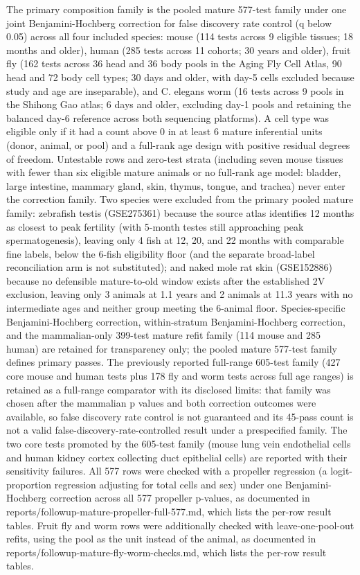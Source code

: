 \documentclass[11pt]{article}
\begin{document}
The primary composition family is the pooled mature 577-test family under one joint Benjamini-Hochberg correction for false discovery rate control (q below 0.05) across all four included species: mouse (114 tests across 9 eligible tissues; 18 months and older), human (285 tests across 11 cohorts; 30 years and older), fruit fly (162 tests across 36 head and 36 body pools in the Aging Fly Cell Atlas, 90 head and 72 body cell types; 30 days and older, with day-5 cells excluded because study and age are inseparable), and C. elegans worm (16 tests across 9 pools in the Shihong Gao atlas; 6 days and older, excluding day-1 pools and retaining the balanced day-6 reference across both sequencing platforms). A cell type was eligible only if it had a count above 0 in at least 6 mature inferential units (donor, animal, or pool) and a full-rank age design with positive residual degrees of freedom. Untestable rows and zero-test strata (including seven mouse tissues with fewer than six eligible mature animals or no full-rank age model: bladder, large intestine, mammary gland, skin, thymus, tongue, and trachea) never enter the correction family. Two species were excluded from the primary pooled mature family: zebrafish testis (GSE275361) because the source atlas identifies 12 months as closest to peak fertility (with 5-month testes still approaching peak spermatogenesis), leaving only 4 fish at 12, 20, and 22 months with comparable fine labels, below the 6-fish eligibility floor (and the separate broad-label reconciliation arm is not substituted); and naked mole rat skin (GSE152886) because no defensible mature-to-old window exists after the established 2V exclusion, leaving only 3 animals at 1.1 years and 2 animals at 11.3 years with no intermediate ages and neither group meeting the 6-animal floor. Species-specific Benjamini-Hochberg correction, within-stratum Benjamini-Hochberg correction, and the mammalian-only 399-test mature refit family (114 mouse and 285 human) are retained for transparency only; the pooled mature 577-test family defines primary passes. The previously reported full-range 605-test family (427 core mouse and human tests plus 178 fly and worm tests across full age ranges) is retained as a full-range comparator with its disclosed limits: that family was chosen after the mammalian p values and both correction outcomes were available, so false discovery rate control is not guaranteed and its 45-pass count is not a valid false-discovery-rate-controlled result under a prespecified family. The two core tests promoted by the 605-test family (mouse lung vein endothelial cells and human kidney cortex collecting duct epithelial cells) are reported with their sensitivity failures. All 577 rows were checked with a propeller regression (a logit-proportion regression adjusting for total cells and sex) under one Benjamini-Hochberg correction across all 577 propeller p-values, as documented in reports/followup-mature-propeller-full-577.md, which lists the per-row result tables. Fruit fly and worm rows were additionally checked with leave-one-pool-out refits, using the pool as the unit instead of the animal, as documented in reports/followup-mature-fly-worm-checks.md, which lists the per-row result tables.
\end{document}
